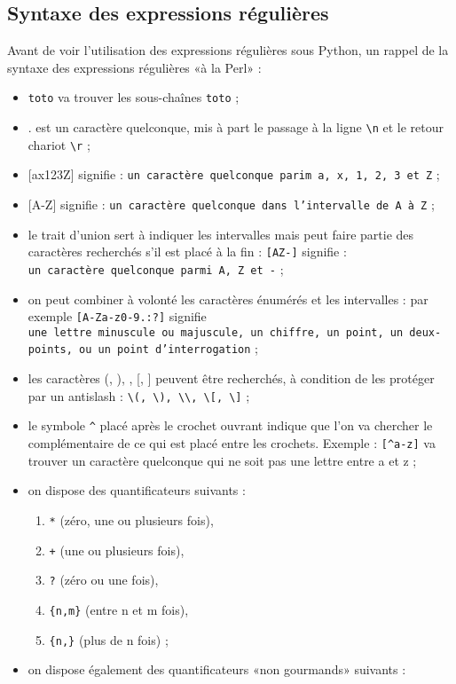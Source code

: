 \documentclass[11pt]{article}
\providecommand{\tightlist}{%
      \setlength{\itemsep}{0pt}\setlength{\parskip}{0pt}}
\begin{document}
    \hypertarget{syntaxe-des-expressions-ruxe9guliuxe8res}{%
\subsection{Syntaxe des expressions
régulières}\label{syntaxe-des-expressions-ruxe9guliuxe8res}}

Avant de voir l'utilisation des expressions régulières sous Python, un
rappel de la syntaxe des expressions régulières «à la Perl» :

\begin{itemize}
\tightlist
\item
  \texttt{toto} va trouver les sous-chaînes \texttt{toto} ;
\item
  . est un caractère quelconque, mis à part le passage à la ligne
  \texttt{\textbackslash{}n} et le retour chariot
  \texttt{\textbackslash{}r} ;
\item
  {[}ax123Z{]} signifie :
  \texttt{un\ caractère\ quelconque\ parim\ a,\ x,\ 1,\ 2,\ 3\ et\ Z} ;
\item
  {[}A-Z{]} signifie :
  \texttt{un\ caractère\ quelconque\ dans\ l’intervalle\ de\ A\ à\ Z} ;
\item
  le trait d'union sert à indiquer les intervalles mais peut faire
  partie des caractères recherchés s'il est placé à la fin :
  \texttt{{[}AZ-{]}} signifie :
  \texttt{un\ caractère\ quelconque\ parmi\ A,\ Z\ et\ -} ;
\item
  on peut combiner à volonté les caractères énumérés et les intervalles
  : par exemple \texttt{{[}A-Za-z0-9.:?{]}} signifie
  \texttt{une\ lettre\ minuscule\ ou\ majuscule,\ un\ chiffre,\ un\ point,\ un\ deux-points,\ ou\ un\ point\ d’interrogation}
  ;
\item
  les caractères (, ), , {[}, {]} peuvent être recherchés, à condition
  de les protéger par un antislash :
  \texttt{\textbackslash{}(,\ \textbackslash{}),\ \textbackslash{}\textbackslash{},\ \textbackslash{}{[},\ \textbackslash{}{]}}
  ;
\item
  le symbole \texttt{\^{}} placé après le crochet ouvrant indique que
  l'on va chercher le complémentaire de ce qui est placé entre les
  crochets. Exemple : \texttt{{[}\^{}a-z{]}} va trouver un caractère
  quelconque qui ne soit pas une lettre entre a et z ;
\item
  on dispose des quantificateurs suivants :

  \begin{enumerate}
  \def\labelenumi{\arabic{enumi}.}
  \tightlist
  \item
    \texttt{*} (zéro, une ou plusieurs fois),
  \item
    \texttt{+} (une ou plusieurs fois),
  \item
    \texttt{?} (zéro ou une fois),
  \item
    \texttt{\{n,m\}} (entre n et m fois),
  \item
    \texttt{\{n,\}} (plus de n fois) ;
  \end{enumerate}
\item
  on dispose également des quantificateurs «non gourmands» suivants :


\end{itemize}
\end{document}

